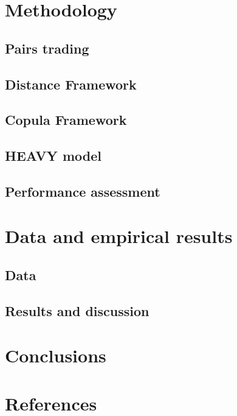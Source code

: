 \documentclass[review]{elsarticle}
\begin{document}
\section{Methodology}

\subsection{Pairs trading} %

\subsection{Distance Framework} %

\subsection{Copula Framework} %

\subsection{HEAVY model} %

\subsection{Performance assessment} 

\section{Data and empirical results}

\subsection{Data} %

\subsection{Results and discussion} 

\section{Conclusions}

\section*{References}


\end{document}
